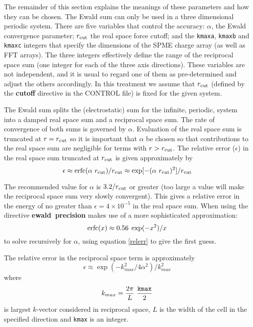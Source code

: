The remainder of this section explains the meanings of these
parameters and how they can be chosen.  The Ewald
sum can only be used in a three dimensional
periodic system.  There are five variables that control the
accuracy: $\alpha$, the Ewald convergence parameter; $r_{\rm cut}$
the real space force cutoff; and the {\tt kmaxa}, {\tt kmaxb} and
{\tt kmaxc} integers that specify the dimensions of the SPME
charge array (as well as FFT arrays).  The three integers
effectively define the range of the reciprocal space sum
(one integer for each of the three axis directions).  These
variables are not independent, and it is usual to regard one of
them as pre-determined and adjust the others accordingly.  In this
treatment we assume that $r_{\rm cut}$ (defined by the {\bf cutoff}
directive in the CONTROL file) is fixed for the given system.

The Ewald sum splits the (electrostatic) sum for the infinite,
periodic, system into a damped real space sum and a reciprocal
space sum.  The rate of convergence of both sums is governed by
$\alpha$.  Evaluation of the real space sum is truncated at
$r=r_{\rm cut}$ so it is important that $\alpha$ be chosen so that
contributions to the real space sum are negligible for terms with
$r>r_{\rm cut}$.  The relative error ($\epsilon$) in the real
space sum truncated at $r_{\rm cut}$ is given approximately
by
\begin{equation}
\epsilon \approx {\rm erfc}(\alpha~r_{\rm cut})/r_{\rm cut}
\approx \exp[-(\alpha~r_{\rm cut})^{2}]/r_{\rm cut} \label{relerr}
\end{equation}

The recommended value for $\alpha$ is $3.2/r_{\rm cut}$ or greater
(too large a value will make the reciprocal space sum very slowly
convergent).  This gives a relative error in the energy of no
greater than $\epsilon = 4 \times 10^{-5}$ in the real space sum.
When using the directive {\bf ewald~precision} \D makes use of a
more sophisticated approximation:
\begin{equation}
{\rm erfc}(x) \approx 0.56 \; \exp(-x^{2})/x
\end{equation}
to solve recursively for $\alpha$, using equation \ref{relerr} to give
the first guess.

The relative error in the reciprocal space term is approximately
\begin{equation}
\epsilon \approx \exp(- k_{max}^{2}/4\alpha^{2})/k_{max}^{2}
\end{equation}
where
\begin{equation}
k_{max} = \frac{2\pi}{L}~\frac{\tt kmax}{2}
\end{equation}
is largest $k$-vector considered in reciprocal space, $L$ is the
width of the cell in the specified direction and {\tt kmax} is an integer.

